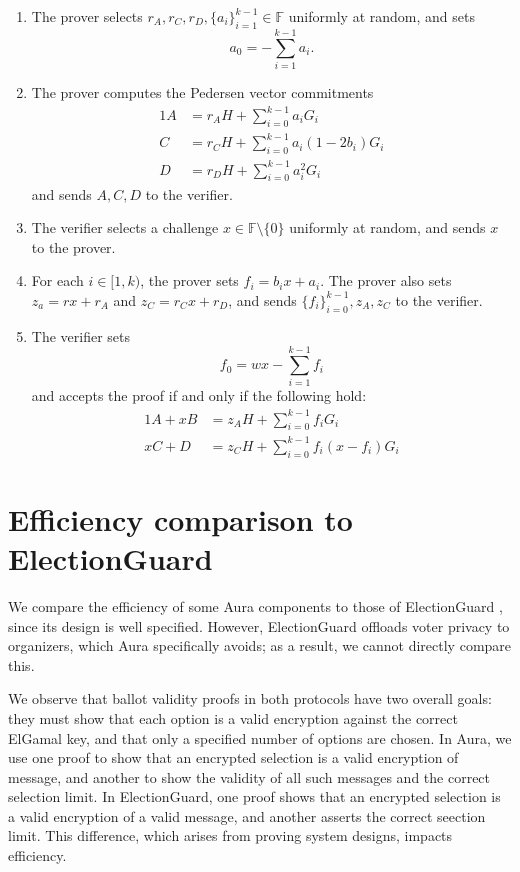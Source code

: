 \documentclass{llncs}
\newcommand{\F}{\mathbb{F}}
\begin{document}
\begin{enumerate}
    \item The prover selects $r_A, r_C, r_D, \{a_i\}_{i=1}^{k-1} \in \F$ uniformly at random, and sets \[ a_0 = - \sum_{i=1}^{k-1} a_i. \]
    \item The prover computes the Pedersen vector commitments
    \begin{alignat*}{1}
        A &= r_A H + \sum_{i=0}^{k-1} a_i G_i \\
        C &= r_C H + \sum_{i=0}^{k-1} a_i(1 - 2b_i) G_i \\
        D &= r_D H + \sum_{i=0}^{k-1} a_i^2 G_i
    \end{alignat*}
    and sends $A, C, D$ to the verifier.
    \item The verifier selects a challenge $x \in \F \setminus \{0\}$ uniformly at random, and sends $x$ to the prover.
    \item For each $i \in [1,k)$, the prover sets $f_i = b_i x + a_i$.
    The prover also sets $z_a = rx + r_A$ and $z_C = r_C x + r_D$, and sends $\{f_i\}_{i=0}^{k-1}, z_A, z_C$ to the verifier.
    \item The verifier sets \[ f_0 = wx - \sum_{i=1}^{k-1} f_i \] and accepts the proof if and only if the following hold:
    \begin{alignat*}{1}
        A + xB &= z_A H + \sum_{i=0}^{k-1} f_i G_i \\
        xC + D &= z_C H + \sum_{i=0}^{k-1} f_i(x - f_i) G_i
    \end{alignat*}
\end{enumerate}


\section{Efficiency comparison to ElectionGuard}
\label{app:efficiency}

We compare the efficiency of some Aura components to those of ElectionGuard \cite{electionguard}, since its design is well specified.
However, ElectionGuard offloads voter privacy to organizers, which Aura specifically avoids; as a result, we cannot directly compare this.

We observe that ballot validity proofs in both protocols have two overall goals: they must show that each option is a valid encryption against the correct ElGamal key, and that only a specified number of options are chosen.
In Aura, we use one proof to show that an encrypted selection is a valid encryption of  message, and another to show the validity of all such messages and the correct selection limit.
In ElectionGuard, one proof shows that an encrypted selection is a valid encryption of a valid message, and another asserts the correct seection limit.
This difference, which arises from proving system designs, impacts efficiency.
\end{document}
